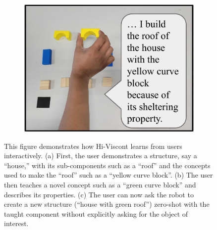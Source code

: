 \begin{figure}[h]
\begin{subfigure}{0.28\textwidth}
\includegraphics[width=\textwidth,page=3]{figures/figure1_breakdown.pdf}
  \subcaption{}
\end{subfigure}


\caption{This figure demonstrates how Hi-Viscont learns from users interactively. (a) First, the user demonstrates a structure, say a ``house,'' with its sub-components such as a ``roof'' and the concepts used to make the ``roof'' such as a ``yellow curve block''. (b) The user then teaches a novel concept such as a ``green curve block'' and describes its properties. (c) The user can now ask the robot to create a new structure (``house with green roof'') zero-shot with the taught component without explicitly asking for the object of interest. }
\label{fig:interactive_task_teaching}
\end{figure}



